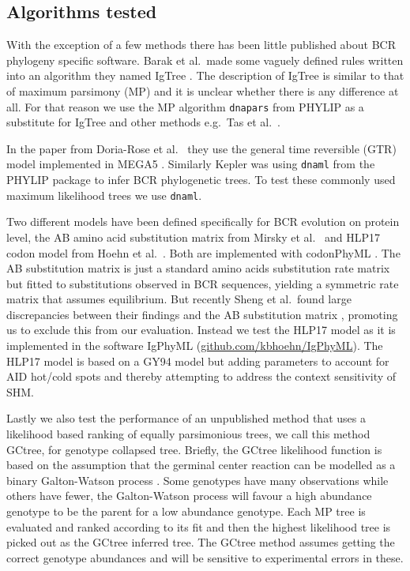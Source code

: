\subsection{Algorithms tested}
With the exception of a few methods there has been little published about BCR phylogeny specific software.
Barak et al.\ made some vaguely defined rules written into an algorithm they named IgTree \cite{Barak2008-fw}.
The description of IgTree is similar to that of maximum parsimony (MP) and it is unclear whether there is any difference at all.
For that reason we use the MP algorithm \texttt{dnapars} from PHYLIP \cite{plotree1989phylip} as a substitute for IgTree and other methods e.g.\ Tas et al.\ \cite{tas2016visualizing}.

In the paper from Doria-Rose et al.\ \cite{Doria-Rose2014-vi} they use the general time reversible (GTR) model implemented in MEGA5 \cite{tamura2011mega5}.
Similarly Kepler \cite{Kepler2013-sy} was using \texttt{dnaml} from the PHYLIP package to infer BCR phylogenetic trees.
To test these commonly used maximum likelihood trees we use \texttt{dnaml}.

Two different models have been defined specifically for BCR evolution on protein level, the AB amino acid substitution matrix from Mirsky et al.\ \cite{mirsky2014antibody} and HLP17 codon model from Hoehn et al.\ \cite{Hoehn2016-wg}.
Both are implemented with codonPhyML \cite{gil2013codonphyml}.
The AB substitution matrix is just a standard amino acids substitution rate matrix but fitted to substitutions observed in BCR sequences, yielding a symmetric rate matrix that assumes equilibrium.
But recently Sheng et al.\ found large discrepancies between their findings and the AB substitution matrix \cite{sheng2017gene}, promoting us to exclude this from our evaluation.
Instead we test the HLP17 model as it is implemented in the software IgPhyML (\url{github.com/kbhoehn/IgPhyML}).
The HLP17 model is based on a GY94 model \cite{goldman1994codon} but adding parameters to account for AID hot/cold spots and thereby attempting to address the context sensitivity of SHM.

Lastly we also test the performance of an unpublished method that uses a likelihood based ranking of equally parsimonious trees, we call this method GCtree, for genotype collapsed tree.
Briefly, the GCtree likelihood function is based on the assumption that the germinal center reaction can be modelled as a binary Galton-Watson process \cite{harris2002theory}.
Some genotypes have many observations while others have fewer, the Galton-Watson process will favour a high abundance genotype to be the parent for a low abundance genotype.
Each MP tree is evaluated and ranked according to its fit and then the highest likelihood tree is picked out as the GCtree inferred tree.
The GCtree method assumes getting the correct genotype abundances and will be sensitive to experimental errors in these.



